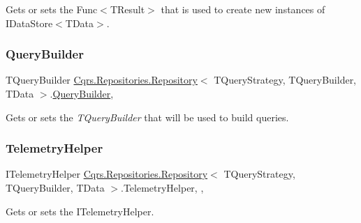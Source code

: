 Gets or sets the Func$<$\+T\+Result$>$ that is used to create new instances of I\+Data\+Store$<$\+T\+Data$>$. 

\mbox{\label{classCqrs_1_1Repositories_1_1Repository_a4447451b7dbcfcd68dfa3fa65a41f357_a4447451b7dbcfcd68dfa3fa65a41f357}} 
\subsubsection{\texorpdfstring{Query\+Builder}{QueryBuilder}}
{\footnotesize\ttfamily T\+Query\+Builder \hyperlink{classCqrs_1_1Repositories_1_1Repository}{Cqrs.\+Repositories.\+Repository}$<$ T\+Query\+Strategy, T\+Query\+Builder, T\+Data $>$.\hyperlink{classCqrs_1_1Repositories_1_1Queries_1_1QueryBuilder}{Query\+Builder}\hspace{0.3cm}{\ttfamily [get]}, {\ttfamily [protected]}}



Gets or sets the {\itshape T\+Query\+Builder}  that will be used to build queries. 

\mbox{\label{classCqrs_1_1Repositories_1_1Repository_aae263dc1dda61f89c011be6d578620bd_aae263dc1dda61f89c011be6d578620bd}} 
\subsubsection{\texorpdfstring{Telemetry\+Helper}{TelemetryHelper}}
{\footnotesize\ttfamily I\+Telemetry\+Helper \hyperlink{classCqrs_1_1Repositories_1_1Repository}{Cqrs.\+Repositories.\+Repository}$<$ T\+Query\+Strategy, T\+Query\+Builder, T\+Data $>$.Telemetry\+Helper\hspace{0.3cm}{\ttfamily [get]}, {\ttfamily [set]}, {\ttfamily [protected]}}



Gets or sets the I\+Telemetry\+Helper. 

